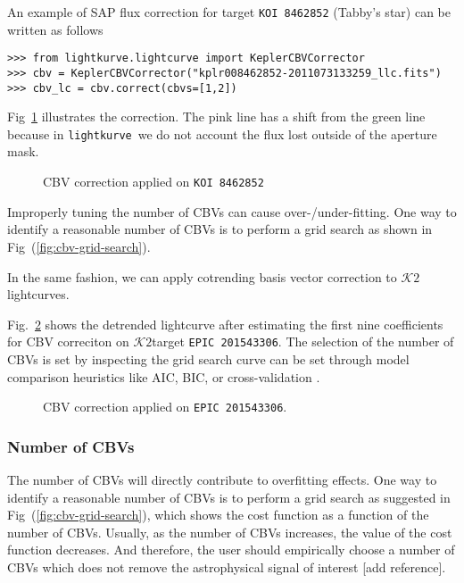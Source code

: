\documentclass[twocolumn]{aastex62}
\newcommand{\KTWO}{$\mathcal{K}\mathit{2}$}
\newcommand{\lightkurve}{\texttt{lightkurve}}
\begin{document}
An example of SAP flux correction for target \texttt{KOI 8462852}
(Tabby's star) can be written as follows
\begin{verbatim}
>>> from lightkurve.lightcurve import KeplerCBVCorrector
>>> cbv = KeplerCBVCorrector("kplr008462852-2011073133259_llc.fits")
>>> cbv_lc = cbv.correct(cbvs=[1,2])
\end{verbatim}

Fig~\ref{fig:cbv-correction} illustrates the correction. The pink line has a shift from
the green line because in \lightkurve~we do not account the flux lost outside of the aperture mask.

\begin{figure}[!htb]
    \centering
    \caption{CBV correction applied on \texttt{KOI 8462852}}
    \label{fig:cbv-correction}
\end{figure}


Improperly tuning the number of CBVs can cause over-/under-fitting. One
way to identify a reasonable number of CBVs is to perform a grid search
as shown in Fig~(\ref{fig:cbv-grid-search}).

In the same fashion, we can apply cotrending basis vector correction to
\KTWO lightcurves.

Fig.~\ref{fig:cbv-correction-k2} shows the detrended lightcurve after estimating
the first nine coefficients for CBV correciton on \KTWO target
 \texttt{EPIC 201543306}. The selection of the number of CBVs is set by inspecting the
grid search curve can be set through model comparison heuristics like AIC, BIC,
or cross-validation \cite{ivezi2014}.

\begin{figure}
    \centering
    \caption{CBV correction applied on \texttt{EPIC 201543306}.
    \label{fig:cbv-correction-k2}}
\end{figure}

\subsubsection{Number of CBVs}
The number of CBVs will directly contribute to overfitting effects. One
way to identify a reasonable number of CBVs is to perform a grid search
as suggested in Fig~(\ref{fig:cbv-grid-search}), which shows the cost
function as a function of the number of CBVs. Usually, as the number of
CBVs increases, the value of the cost function decreases. And therefore,
the user should empirically choose a number of CBVs which does not
remove the astrophysical signal of interest [add reference].
\end{document}
